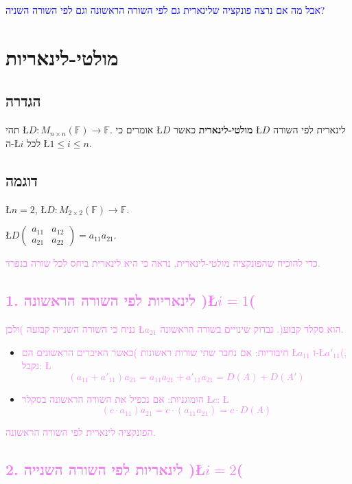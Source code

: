 \documentclass[english,hebrew]{article}
\newcommand{\sqrmn}{M_{n\times n}(\mathbb{F})}
\begin{document}
\textcolor{blue}{אבל מה אם נרצה פונקציה שלינארית גם לפי השורה הראשונה
וגם לפי השורה השניה?}

\section{מולטי-לינאריות}

\subsection{הגדרה}

תהי \L{$D:\sqrmn\rightarrow\mathbb{F}$}. אומרים כי \L{$D$} \textbf{מולטי-לינארית
}כאשר \L{$D$} לינארית לפי השורה ה-\L{$i$} לכל \L{$1\leq i\leq n$}. 

\subsection{דוגמה}

\L{$n=2$}, \L{$D:M_{2\times2}(\mathbb{F})\rightarrow\mathbb{F}$}.

\L{$D\begin{pmatrix}a_{11} & a_{12}\\
a_{21} & a_{22}
\end{pmatrix}=a_{11}a_{21}$}.\\
\medskip{}

\textcolor{violet}{כדי להוכיח שהפונקציה מולטי-לינארית, נראה כי היא
לינארית ביחס לכל שורה בנפרד.}

\subsection*{\textcolor{violet}{1. לינאריות לפי השורה הראשונה )\L{$i=1$}(}}

\textcolor{violet}{נניח כי השורה השנייה קבועה )ולכן \L{$a_{21}$}
הוא סקלר קבוע(. נבדוק שינויים בשורה הראשונה. }
\begin{itemize}
\item \textcolor{violet}{חיבוריות: אם נחבר שתי שורות ראשונות )כאשר האיברים
הראשונים הם \L{$a_{11}$} ו-\L{$a'_{11}$}(, נקבל: \L{%
\[
(a_{11}+a'_{11})a_{21}=a_{11}a_{21}+a'_{11}a_{21}=D(A)+D(A')
\]
}%
}
\item \textcolor{violet}{הומוגניות: אם נכפיל את השורה הראשונה בסקלר \L{$c$}:
\L{%
\[
(c\cdot a_{11})a_{21}=c\cdot(a_{11}a_{21})=c\cdot D(A)
\]
}%
}
\end{itemize}
\textcolor{violet}{הפונקציה לינארית לפי השורה הראשונה.}

\subsection*{\textcolor{violet}{2. לינאריות לפי השורה השנייה )\L{$i=2$}(}}
\end{document}
